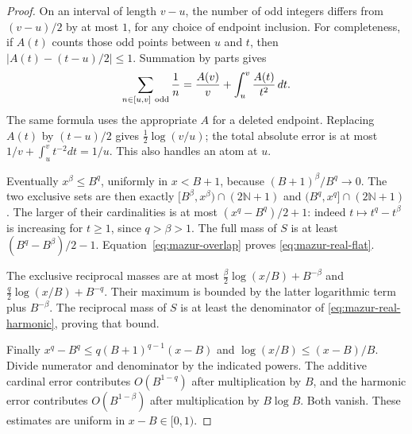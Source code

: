 \documentclass[11pt]{article}
\theoremstyle{remark}\newtheorem{remark}[proposition]{Remark}
\begin{document}
\begin{proof}
On an interval of length \(v-u\), the number of odd integers differs
from \((v-u)/2\) by at most \(1\), for any choice of endpoint inclusion.
For completeness, if \(A(t)\) counts those odd points between \(u\)
and \(t\), then \(|A(t)-(t-u)/2|\le1\). Summation by parts gives
\[
 \sum_{n\in[u,v]\ {\rm odd}}\frac1n
 =\frac{A(v)}v+\int_u^v\frac{A(t)}{t^2}\,dt.
\]
The same formula uses the appropriate \(A\) for a deleted endpoint.
Replacing \(A(t)\) by \((t-u)/2\) gives
\(\tfrac12\log(v/u)\); the total absolute error is at most
\(1/v+\int_u^v t^{-2}dt=1/u\).
This also handles an atom at \(u\).

Eventually \(x^\beta\le B^q\), uniformly in \(x<B+1\), because
\((B+1)^\beta/B^q\to0\).
The two exclusive sets are then exactly
\([B^\beta,x^\beta)\cap(2\mathbb N+1)\) and
\((B^q,x^q]\cap(2\mathbb N+1)\).
The larger of their cardinalities is at most
\((x^q-B^q)/2+1\): indeed \(t\mapsto t^q-t^\beta\) is increasing
for \(t\ge1\), since \(q>\beta>1\).
The full mass of \(S\) is at least \((B^q-B^\beta)/2-1\).
Equation~\eqref{eq:mazur-overlap} proves \eqref{eq:mazur-real-flat}.

The exclusive reciprocal masses are at most
\(\frac{\beta}{2}\log(x/B)+B^{-\beta}\) and
\(\frac q2\log(x/B)+B^{-q}\).
Their maximum is bounded by the latter logarithmic term plus
\(B^{-\beta}\). The reciprocal mass of \(S\) is at least the
denominator of \eqref{eq:mazur-real-harmonic}, proving that bound.

Finally \(x^q-B^q\le q(B+1)^{q-1}(x-B)\) and
\(\log(x/B)\le(x-B)/B\).
Divide numerator and denominator by the indicated powers.
The additive cardinal error contributes \(O(B^{1-q})\) after
multiplication by \(B\), and the harmonic error contributes
\(O(B^{1-\beta})\) after multiplication by \(B\log B\).
Both vanish. These estimates are uniform in \(x-B\in[0,1)\).
\end{proof}
\end{document}
